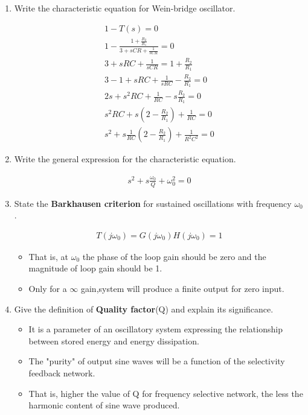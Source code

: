 \begin{enumerate}[label=\thesubsection.\arabic*.,ref=\thesubsection.\theenumi]
\item Write the characteristic equation for Wein-bridge oscillator.

\solution
\begin{align}
    1 - T(s) = 0  \\
    1 - \frac{1 + \frac{R_2}{R_1}}{3 + sCR + \frac{1}{sCR}} = 0  \\
    3 + sRC + \frac{1}{sCR} = 1 + \frac{R_2}{R_1}  \\
    3 - 1 +sRC +\frac{1}{sRC} -\frac{R_2}{R_1} = 0  \\
    2s + s^2 RC + \frac{1}{RC} -s\frac{R_2}{R_1} = 0  \\
    s^2 RC + s(2 - \frac{R_2}{R_1}) + \frac{1}{RC} =0 \\
    s^2 + s \frac{1}{RC}(2-\frac{R_2}{R_1}) + \frac{1}{R^2C^2} = 0 \label{eq:ee18btech11044_3_2}
\end{align}

\item
Write the general expression for the characteristic equation.

\solution
\begin{align}
    s^2 + s\frac{\omega_0}{Q} + \omega_0^2 = 0 \label{eq:ee18btech11044_3_3}
\end{align}

\item State the \textbf{Barkhausen criterion} for sustained oscillations with frequency $\omega_0$.

\solution
\begin{align}
    T(j\omega_0) = G(j\omega_0)  H(j\omega_0) = 1
\end{align}
\begin{itemize}
    \item That is, at $\omega_0$ the phase of the loop gain should be zero and the magnitude of loop gain should be 1.
    \item Only for a $\infty$ gain,system will produce a finite output for zero input. 
\end{itemize}

\item Give the definition of \textbf{Quality factor}(Q) and explain its significance.

\solution
\begin{itemize}
    \item It is a parameter of an oscillatory system expressing the relationship between stored energy and energy dissipation.
    \item The "purity" of output sine waves will be a function of the selectivity feedback network.
    \item That is, higher the value of Q for frequency selective network, the less the harmonic content of sine wave produced.
\end{itemize}
 



\end{enumerate}
